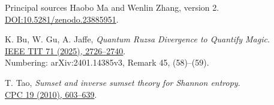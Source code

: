 \documentclass{beamer}
\begin{document}
\begin{frame}{Principal sources}
\small
Haobo Ma and Wenlin Zhang, version 2.\\
\href{https://doi.org/10.5281/zenodo.23885951}{DOI:10.5281/zenodo.23885951}.
\medskip

K. Bu, W. Gu, A. Jaffe, \emph{Quantum Ruzsa Divergence to Quantify Magic}.\\
\href{https://doi.org/10.1109/TIT.2025.3543276}{IEEE TIT 71 (2025), 2726--2740}.\\
Numbering: arXiv:2401.14385v3, Remark 45, (58)--(59).
\medskip

T. Tao, \emph{Sumset and inverse sumset theory for Shannon entropy}.\\
\href{https://doi.org/10.1017/S0963548309990642}{CPC 19 (2010), 603--639}.
\end{frame}
\FormalVerification
\end{document}
